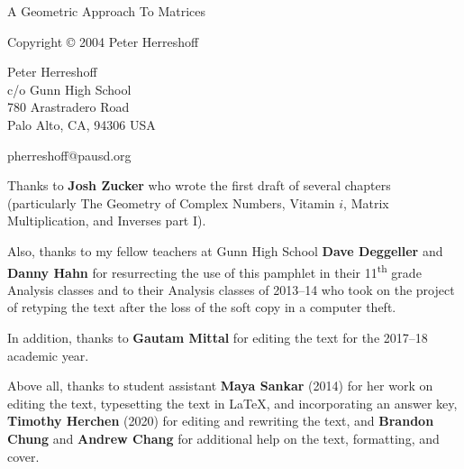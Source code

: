\documentclass[../gatm.tex]{subfiles}
\begin{document}
\newcommand\dnew{\vspace{1cm}}

\begin{center}
	\vspace*{\fill}

	\doublespacing
	A Geometric Approach To Matrices

	Copyright \copyright{} 2004 Peter Herreshoff  %

	\vspace{1cm}

	Peter Herreshoff\\
	c/o Gunn High School\\
	780 Arastradero Road\\
	Palo Alto, CA, 94306 USA

	\vspace{.5cm}

	pherreshoff@pausd.org

	\vspace{1cm}
\end{center}

\noindent Thanks to \textbf{Josh Zucker} who wrote the first draft of several chapters (particularly The Geometry of Complex Numbers, Vitamin $i$, Matrix Multiplication, and Inverses part I).

Also, thanks to my fellow teachers at Gunn High School \textbf{Dave Deggeller} and \textbf{Danny Hahn} for resurrecting the use of this pamphlet in their 11\textsuperscript{th} grade Analysis classes and to their Analysis classes of 2013--14 who took on the project of retyping the text after the loss of the soft copy in a computer theft.

In addition, thanks to \textbf{Gautam Mittal} for editing the text for the 2017--18 academic year.

Above all, thanks to student assistant \textbf{Maya Sankar} (2014) for her work on editing the text, typesetting the text in \LaTeX{}, and incorporating an answer key, \textbf{Timothy Herchen} (2020) for editing and rewriting the text, and \textbf{Brandon Chung} and \textbf{Andrew Chang} for additional help on the text, formatting, and cover.

\vspace*{\fill}
\end{document}
